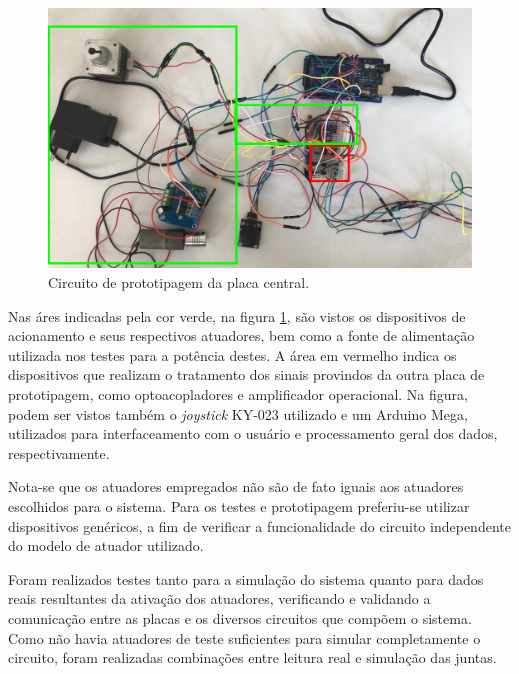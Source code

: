 \begin{figure}[ht]
    \caption{Circuito de prototipagem da placa central.}

    \begin{centering}
        \includegraphics[width=1\columnwidth]{images/resultados/proto-main.jpeg} 
    \par\end{centering}

    \label{fig:proto-main}
\end{figure}

Nas áres indicadas pela cor verde, na figura \ref{fig:proto-main}, são vistos os 
dispositivos de acionamento e seus respectivos atuadores, bem como a fonte de 
alimentação utilizada nos testes para a potência destes.
A área em vermelho indica os dispositivos que realizam o tratamento dos sinais 
provindos da outra placa de prototipagem, como optoacopladores e amplificador operacional.
Na figura, podem ser vistos também o \textit{joystick} KY-023 utilizado e um Arduino Mega,
utilizados para interfaceamento com o usuário e processamento geral dos dados, respectivamente.

Nota-se que os atuadores empregados não são de fato iguais aos atuadores escolhidos para o 
sistema. Para os testes e prototipagem preferiu-se utilizar dispositivos genéricos, a fim 
de verificar a funcionalidade do circuito independente do modelo de atuador utilizado.

Foram realizados testes tanto para a simulação do sistema quanto para dados reais resultantes
da ativação dos atuadores, verificando e validando a comunicação entre as placas e os diversos circuitos
que compõem o sistema. Como não havia atuadores de teste suficientes para simular completamente
o circuito, foram realizadas combinações entre leitura real e simulação das juntas.

